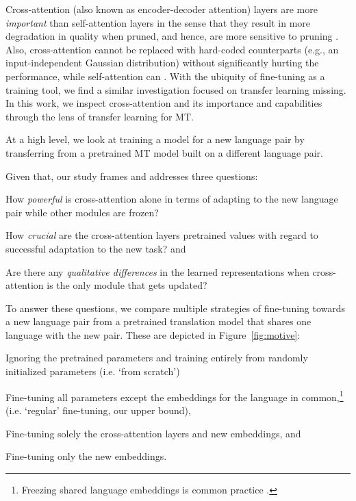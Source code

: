 Cross-attention (also known as encoder-decoder attention) layers are more \textit{important} than self-attention layers in the sense that they result in more degradation in quality when pruned, and hence, are more sensitive to pruning \cite{voita-etal-2019-analyzing,NEURIPS2019_2c601ad9}. Also, cross-attention cannot be replaced with hard-coded counterparts (e.g., an input-independent Gaussian distribution) without significantly hurting the performance, while self-attention can \cite{you-etal-2020-hard}. With the ubiquity of fine-tuning as a training tool, we find a similar investigation focused on transfer learning missing. In this work, we inspect cross-attention and its importance and capabilities through the lens of transfer learning for MT.

At a high level, we look at training a model for a new language pair by transferring from a pretrained MT model built on a different language pair.

 Given that, our study frames and addresses three questions:

\begin{enumerate*}[label=\arabic*)]
    \item How \textit{powerful} is cross-attention alone in terms of adapting to the new language pair while other modules are frozen?
    \item How \textit{crucial} are the cross-attention layers pretrained values with regard to successful adaptation to the new task? and \item Are there any \textit{qualitative differences} in the learned representations when cross-attention is the only module that gets updated?
\end{enumerate*}

To answer these questions, we compare multiple strategies of fine-tuning towards a new language pair from a pretrained translation model that shares one language with the new pair. These are depicted in Figure~\ref{fig:motive}:

\begin{enumerate*}[label=\alph*)]
    \item Ignoring the pretrained parameters and training entirely from randomly initialized parameters (i.e. `from scratch')
    \item Fine-tuning all parameters except the embeddings for the language in common,\footnote{Freezing shared language embeddings is common practice \cite{zoph-etal-2016-transfer}.} (i.e. `regular' fine-tuning, our upper bound), \item Fine-tuning solely the cross-attention layers and new embeddings, and \item Fine-tuning only the new embeddings.
\end{enumerate*}

